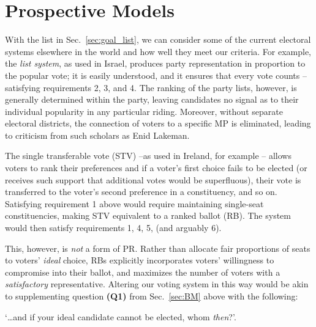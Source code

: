 \section{Prospective Models}
\label{sec:alt_models}

With the list in Sec.~\ref{sec:goal_list}, we can consider some of the current electoral systems elsewhere in the world and how well they meet our criteria. For example, the \emph{list system}, as used in Israel, produces party representation in proportion to the popular vote; it is easily understood, and it ensures that every vote counts \---satisfying requirements 2, 3, and 4. 
The ranking of the party lists, however, is generally determined within the party, leaving candidates no signal as to their individual popularity in any particular riding. Moreover, without separate electoral districts, the connection of voters to a specific MP is eliminated, leading to criticism from such scholars as Enid Lakeman\cite{Lakeman}.

The single transferable vote (STV) \---as used in Ireland, for example\cite{Irish_howto_vote_doc}
\--- allows voters to  rank their preferences and if a voter's first choice fails to be elected (or receives such support that additional votes would be superfluous), their vote is transferred to the voter's second preference in a constituency, and so on. 
Satisfying requirement 1 above would require maintaining single-seat constituencies, making STV equivalent to a ranked ballot (RB). The system would then satisfy requirements 1, 4, 5, (and arguably 6). 

This, however, is \emph{not} a form of PR. 
Rather than allocate fair proportions of seats to voters' \emph{ideal} choice, RBs explicitly incorporates voters' willingness to compromise into their ballot, and maximizes the number of voters with a \emph{satisfactory} representative.
Altering our voting system in this way would be akin to supplementing question \textbf{(Q1)} from Sec.~\ref{sec:BM} above with the following: 

\begin{tcolorbox}[colback=white!5!white,colframe=blue!55!black]
`\ldots and if your ideal candidate cannot be elected, whom \emph{then}?'. 
\end{tcolorbox}

